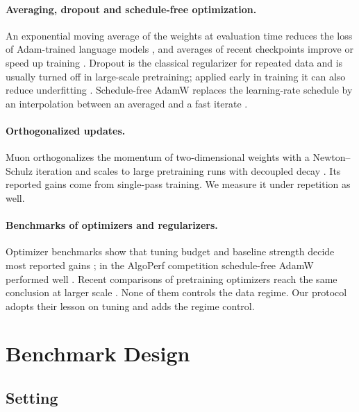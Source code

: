 \documentclass[twoside,11pt]{article}
\begin{document}
\paragraph{Averaging, dropout and schedule-free optimization.}
An exponential moving average of the weights at evaluation time reduces the loss of Adam-trained language models \citep{moralesbrotons2024ema}, and averages of recent checkpoints improve or speed up training \citep{izmailov2018averaging,kaddour2022stop,sanyal2023early}. Dropout \citep{srivastava2014dropout} is the classical regularizer for repeated data and is usually turned off in large-scale pretraining; applied early in training it can also reduce underfitting \citep{liu2023dropout}. Schedule-free AdamW replaces the learning-rate schedule by an interpolation between an averaged and a fast iterate \citep{defazio2024road}.

\paragraph{Orthogonalized updates.}
Muon orthogonalizes the momentum of two-dimensional weights with a Newton--Schulz iteration \citep{jordan2024muon} and scales to large pretraining runs with decoupled decay \citep{liu2025muon}. Its reported gains come from single-pass training. We measure it under repetition as well.

\paragraph{Benchmarks of optimizers and regularizers.}
Optimizer benchmarks show that tuning budget and baseline strength decide most reported gains \citep{schmidt2021descending,dahl2023benchmarking,kaddour2023notrain}; in the AlgoPerf competition schedule-free AdamW performed well \citep{kasimbeg2025algoperf}. Recent comparisons of pretraining optimizers reach the same conclusion at larger scale \citep{wen2026fantastic,semenov2025benchmarking}. None of them controls the data regime. Our protocol adopts their lesson on tuning and adds the regime control.

\section{Benchmark Design}
\label{sec:design}

\subsection{Setting}
\end{document}
